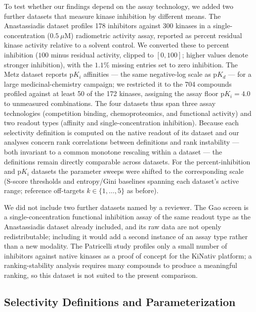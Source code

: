 \documentclass[journal=jcisd8,manuscript=article]{achemso}
\begin{document}
To test whether our findings depend on the assay technology, we added two
further datasets that measure kinase inhibition by different means.
The Anastassiadis dataset\cite{Anastassiadis2011} profiles 178 inhibitors
against 300 kinases in a single-concentration ($0.5~\mu$M) radiometric activity
assay, reported as percent residual kinase activity relative to a solvent
control.
We converted these to percent inhibition ($100$ minus residual activity,
clipped to $[0,100]$; higher values denote stronger inhibition), with the
$1.1\%$ missing entries set to zero inhibition.
The Metz dataset\cite{Metz2011} reports $\mathrm{p}K_i$ affinities --- the same
negative-log scale as $\mathrm{p}K_d$ --- for a large medicinal-chemistry
campaign; we restricted it to the 704 compounds profiled against at least 50 of
the 172 kinases, assigning the assay floor $\mathrm{p}K_i = 4.0$ to unmeasured
combinations.
The four datasets thus span three assay technologies (competition binding,
chemoproteomics, and functional activity) and two readout types (affinity and
single-concentration inhibition).
Because each selectivity definition is computed on the native readout of its
dataset and our analyses concern rank correlations between definitions and rank
instability --- both invariant to a common monotone rescaling within a dataset
--- the definitions remain directly comparable across datasets.
For the percent-inhibition and $\mathrm{p}K_i$ datasets the parameter sweeps
were shifted to the corresponding scale (S-score thresholds and entropy/Gini
baselines spanning each dataset's active range; reference off-targets
$k \in \{1,\ldots,5\}$ as before).

We did not include two further datasets named by a reviewer.
The Gao screen\cite{Gao2013} is a single-concentration functional inhibition
assay of the same readout type as the Anastassiadis dataset already included,
and its raw data are not openly redistributable; including it would add a
second instance of an assay type rather than a new modality.
The Patricelli study\cite{Patricelli2011} profiles only a small number of
inhibitors against native kinases as a proof of concept for the KiNativ
platform; a ranking-stability analysis requires many compounds to produce a
meaningful ranking, so this dataset is not suited to the present comparison.

\subsection{Selectivity Definitions and Parameterization}
\label{sec:methods:defs}
\end{document}
